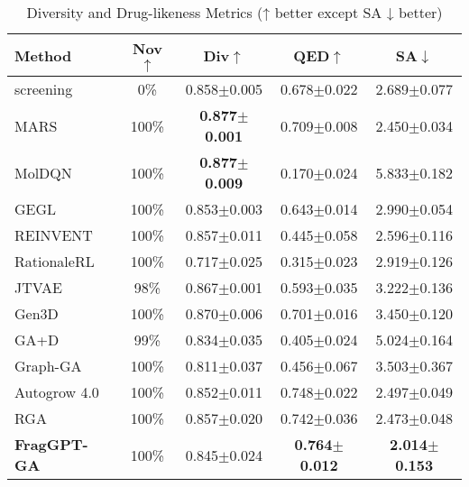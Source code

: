 \documentclass[lettersize,journal]{IEEEtran}
\begin{document}
\begin{table}[!t]
    \caption{Diversity and Drug-likeness Metrics (↑ better except SA ↓ better)}
    \label{tab:diversity_metrics}
    \centering    
    \small
    \setlength{\tabcolsep}{4pt}
    
    \begin{tabular}{l c c c c}
        \hline\hline
        Method & Nov$\uparrow$ & Div$\uparrow$ & QED$\uparrow$ & SA$\downarrow$ \\
        \hline
        screening & 0\% & 0.858$\pm$0.005 & 0.678$\pm$0.022 & 2.689$\pm$0.077 \\
        MARS & 100\% & \textbf{0.877}$\pm$\textbf{0.001} & 0.709$\pm$0.008 & 2.450$\pm$0.034 \\
            MolDQN & 100\% & \textbf{0.877}$\pm$\textbf{0.009} & 0.170$\pm$0.024 & 5.833$\pm$0.182 \\
        GEGL & 100\% & 0.853$\pm$0.003 & 0.643$\pm$0.014 & 2.990$\pm$0.054 \\
        REINVENT & 100\% & 0.857$\pm$0.011 & 0.445$\pm$0.058 & 2.596$\pm$0.116 \\
        RationaleRL & 100\% & 0.717$\pm$0.025 & 0.315$\pm$0.023 & 2.919$\pm$0.126 \\
        JTVAE & 98\% & 0.867$\pm$0.001 & 0.593$\pm$0.035 & 3.222$\pm$0.136 \\
        Gen3D & 100\% & 0.870$\pm$0.006 & 0.701$\pm$0.016 & 3.450$\pm$0.120 \\
        GA+D & 99\% & 0.834$\pm$0.035 & 0.405$\pm$0.024 & 5.024$\pm$0.164 \\
        Graph-GA & 100\% & 0.811$\pm$0.037 & 0.456$\pm$0.067 & 3.503$\pm$0.367 \\
        Autogrow 4.0 & 100\% & 0.852$\pm$0.011 & 0.748$\pm$0.022 & 2.497$\pm$0.049 \\
        RGA  & 100\% & 0.857$\pm$0.020 & 0.742$\pm$0.036 & 2.473$\pm$0.048 \\                 
        \hline
        \textbf{FragGPT-GA} & 100\% & 0.845$\pm$0.024 & \textbf{0.764$\pm$0.012} & \textbf{2.014$\pm$0.153} \\            
        \hline\hline
    \end{tabular}
\end{table}
\end{document}
